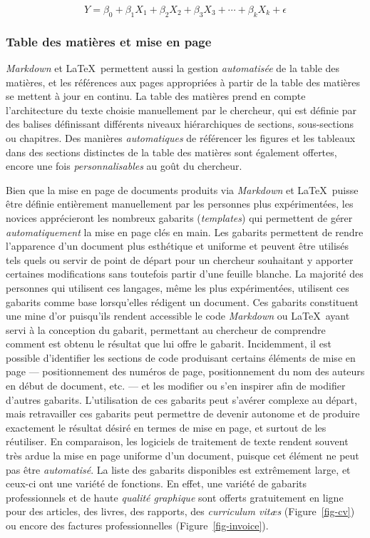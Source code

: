 \documentclass[
  letterpaper,
  DIV=11,
  numbers=noendperiod,
  oneside]{scrreprt}
\begin{document}
\begin{equation}
    Y = \beta_0 + \beta_1 X_1 + \beta_2 X_2 + \beta_3 X_3 + \cdots + \beta_k X_k + \epsilon
\end{equation}

\hypertarget{table-des-matiuxe8res-et-mise-en-page}{%
\subsubsection{Table des matières et mise en
page}\label{table-des-matiuxe8res-et-mise-en-page}}

\emph{Markdown} et \LaTeX{}~permettent aussi la gestion
\emph{automatisée} de la table des matières, et les références aux pages
appropriées à partir de la table des matières se mettent à jour en
continu. La table des matières prend en compte l'architecture du texte
choisie manuellement par le chercheur, qui est définie par des balises
définissant différents niveaux hiérarchiques de sections, sous-sections
ou chapitres. Des manières \emph{automatiques} de référencer les figures
et les tableaux dans des sections distinctes de la table des matières
sont également offertes, encore une fois \emph{personnalisables} au goût
du chercheur.

Bien que la mise en page de documents produits via \emph{Markdown} et
\LaTeX{}~puisse être définie entièrement manuellement par les personnes
plus expérimentées, les novices apprécieront les nombreux gabarits
(\emph{templates}) qui permettent de gérer \emph{automatiquement} la
mise en page clés en main. Les gabarits permettent de rendre l'apparence
d'un document plus esthétique et uniforme et peuvent être utilisés tels
quels ou servir de point de départ pour un chercheur souhaitant y
apporter certaines modifications sans toutefois partir d'une feuille
blanche. La majorité des personnes qui utilisent ces langages, même les
plus expérimentées, utilisent ces gabarits comme base lorsqu'elles
rédigent un document. Ces gabarits constituent une mine d'or puisqu'ils
rendent accessible le code \emph{Markdown} ou \LaTeX{}~ayant servi à la
conception du gabarit, permettant au chercheur de comprendre comment est
obtenu le résultat que lui offre le gabarit. Incidemment, il est
possible d'identifier les sections de code produisant certains éléments
de mise en page --- positionnement des numéros de page, positionnement
du nom des auteurs en début de document, etc. --- et les modifier ou
s'en inspirer afin de modifier d'autres gabarits. L'utilisation de ces
gabarits peut s'avérer complexe au départ, mais retravailler ces
gabarits peut permettre de devenir autonome et de produire exactement le
résultat désiré en termes de mise en page, et surtout de les réutiliser.
En comparaison, les logiciels de traitement de texte rendent souvent
très ardue la mise en page uniforme d'un document, puisque cet élément
ne peut pas être \emph{automatisé}. La liste des gabarits disponibles
est extrêmement large, et ceux-ci ont une variété de fonctions. En
effet, une variété de gabarits professionnels et de haute \emph{qualité
graphique} sont offerts gratuitement en ligne pour des articles, des
livres, des rapports, des \emph{curriculum vitæs} (Figure~\ref{fig-cv})
ou encore des factures professionnelles (Figure~\ref{fig-invoice}).
\end{document}
